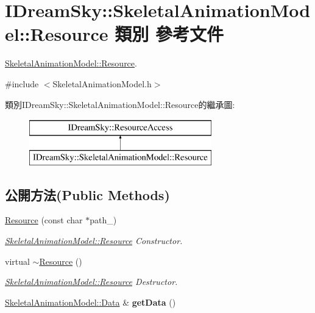 \hypertarget{class_i_dream_sky_1_1_skeletal_animation_model_1_1_resource}{}\section{I\+Dream\+Sky\+:\+:Skeletal\+Animation\+Model\+:\+:Resource 類別 參考文件}
\label{class_i_dream_sky_1_1_skeletal_animation_model_1_1_resource}


\hyperlink{class_i_dream_sky_1_1_skeletal_animation_model_1_1_resource}{Skeletal\+Animation\+Model\+::\+Resource}.  




{\ttfamily \#include $<$Skeletal\+Animation\+Model.\+h$>$}

類別\+I\+Dream\+Sky\+:\+:Skeletal\+Animation\+Model\+:\+:Resource的繼承圖\+:\begin{figure}[H]
\begin{center}
\leavevmode
\includegraphics[height=2.000000cm]{class_i_dream_sky_1_1_skeletal_animation_model_1_1_resource}
\end{center}
\end{figure}
\subsection*{公開方法(Public Methods)}
\begin{DoxyCompactItemize}
\item 
\hyperlink{class_i_dream_sky_1_1_skeletal_animation_model_1_1_resource_a7e299f2e24f0b23182df741af5c8f2a5}{Resource} (const char $\ast$path\+\_\+)
\begin{DoxyCompactList}\small\item\em \hyperlink{class_i_dream_sky_1_1_skeletal_animation_model_1_1_resource}{Skeletal\+Animation\+Model\+::\+Resource} Constructor. \end{DoxyCompactList}\item 
virtual \hyperlink{class_i_dream_sky_1_1_skeletal_animation_model_1_1_resource_a3cc030aab705211f7508024793a92984}{$\sim$\+Resource} ()
\begin{DoxyCompactList}\small\item\em \hyperlink{class_i_dream_sky_1_1_skeletal_animation_model_1_1_resource}{Skeletal\+Animation\+Model\+::\+Resource} Destructor. \end{DoxyCompactList}\item 
\hyperlink{class_i_dream_sky_1_1_skeletal_animation_model_1_1_data}{Skeletal\+Animation\+Model\+::\+Data} \& {\bfseries get\+Data} ()\hypertarget{class_i_dream_sky_1_1_skeletal_animation_model_1_1_resource_abc55ab23cfd4ba9b12b8c51b1a57277d}{}\label{class_i_dream_sky_1_1_skeletal_animation_model_1_1_resource_abc55ab23cfd4ba9b12b8c51b1a57277d}

\end{DoxyCompactItemize}
